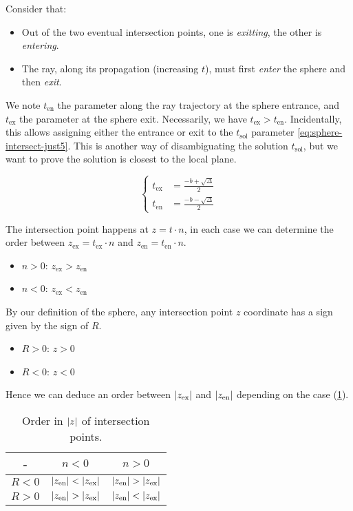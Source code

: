 Consider that: \begin{itemize}
\item Out of the two eventual intersection points, one is \emph{exitting},
the other is \emph{entering}.
\item The ray, along its propagation (increasing $t$), must first \emph{enter}
the sphere and then \emph{exit}.
\end{itemize}

We note $t_\textrm{en}$ the parameter along the ray trajectory at the sphere
entrance, and $t_\textrm{ex}$ the parameter at the sphere exit. Necessarily,
we have $t_\textrm{ex} > t_\textrm{en}$. Incidentally, this allows assigning
either the entrance or exit to the $t_\textrm{sol}$ parameter
\cref{eq:sphere-intersect-just5}. This is another way of disambiguating the
solution $t_\textrm{sol}$, but we want to prove the solution is closest to the
local plane.

\begin{equation}
\begin{cases}
t_\textrm{ex} &= \frac{-b + \sqrt{\Delta}}{2} \\
t_\textrm{en} &= \frac{-b - \sqrt{\Delta}}{2}
\end{cases}
\end{equation}

The intersection point happens at $z = t \cdot n$, in each case we can
determine the order between $z_\textrm{ex} = t_\textrm{ex} \cdot n$ and
$z_\textrm{en} = t_\textrm{en} \cdot n$.

\begin{itemize}
\item $n>0$: $z_\textrm{ex} > z_\textrm{en}$
\item $n<0$: $z_\textrm{ex} < z_\textrm{en}$
\end{itemize}

By our definition of the sphere, any intersection point $z$ coordinate
has a sign given by the sign of $R$.

\begin{itemize}
\item $R>0$: $z>0$
\item $R<0$: $z<0$
\end{itemize}

Hence we can deduce an order between $\abs{z_\textrm{ex}}$ and
$\abs{z_\textrm{en}}$ depending on the case
(\cref{tab:sphere-intersection-zorder}).

\begin{table} \caption{\label{tab:sphere-intersection-zorder} 
Order in $\abs{z}$ of intersection points.}
\begin{tabular}{| c | c | c |} \hline
-       & $n < 0$   & $n > 0$  \\ \hline
$R < 0$ & $\abs{z_\textrm{en}} < \abs{z_\textrm{ex}}$ &
          $\abs{z_\textrm{en}} > \abs{z_\textrm{ex}}$     \\ \hline
$R > 0$ & $\abs{z_\textrm{en}} > \abs{z_\textrm{ex}}$ &
          $\abs{z_\textrm{en}} < \abs{z_\textrm{ex}}$ \\
\hline \end{tabular} \end{table}

